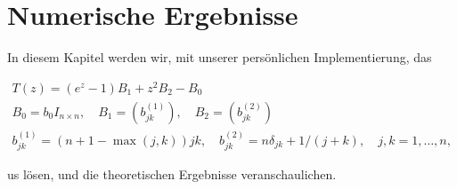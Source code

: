 \chapter{Numerische Ergebnisse}

In diesem Kapitel werden wir, mit unserer persönlichen Implementierung, das 

\begin{gather*}
    T(z) = (e^z - 1) B_1 + z^2 B_2 - B_0 \\
    B_0 = b_0 I_{n\times n},
    \quad
    B_1 = (b_{j k}^{(1)}),
    \quad
    B_2 = (b_{j k}^{(2)}) \\
    b_{j k}^{(1)} = (n + 1 - \max(j, k)) j k,
    \quad
    b_{j k}^{(2)} = n \delta_{j k} + 1 / (j + k),
    \quad
    j, k = 1, \dots, n,
\end{gather*}

us \cite{saad2020rational} lösen, und die theoretischen Ergebnisse veranschaulichen.
